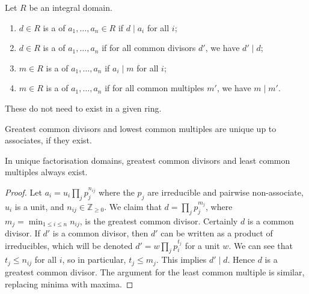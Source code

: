 \begin{definition}
	Let $R$ be an integral domain.
	\begin{enumerate}
		\item $d \in R$ is a  of $a_1, \dots, a_n \in R$ if $d \mid a_i$ for all $i$;
		\item $d \in R$ is a  of $a_1, \dots, a_n$ if for all common divisors $d'$, we have $d' \mid d$;
		\item $m \in R$ is a  of $a_1, \dots, a_n$ if $a_i \mid m$ for all $i$;
		\item $m \in R$ is a  of $a_1, \dots, a_n$ if for all common multiples $m'$, we have $m \mid m'$.
	\end{enumerate}
\end{definition}

\begin{warning}
	These do not need to exist in a given ring.
\end{warning}

\begin{remark}
	Greatest common divisors and lowest common multiples are unique up to associates, if they exist.
\end{remark}

\begin{proposition} \label{prp:10.9}
	In unique factorisation domains, greatest common divisors and least common multiples always exist.
\end{proposition}

\begin{proof}
	Let $a_i = u_i \prod_j p_j^{n_{ij}}$ where the $p_j$ are irreducible and pairwise non-associate, $u_i$ is a unit, and $n_{ij} \in \mathbb Z_{\geq 0}$.
	We claim that $d = \prod_j p_j^{m_j}$, where $m_j = \min_{1 \leq i \leq n} n_{ij}$, is the greatest common divisor.
	Certainly $d$ is a common divisor.
	If $d'$ is a common divisor, then $d'$ can be written as a product of irreducibles, which will be denoted $d' = w \prod_j p_i^{t_j}$ for a unit $w$.
	We can see that $t_j \leq n_{ij}$ for all $i$, so in particular, $t_j \leq m_j$.
	This implies $d' \mid d$.
	Hence $d$ is a greatest common divisor.
	The argument for the least common multiple is similar, replacing minima with maxima.
\end{proof}


